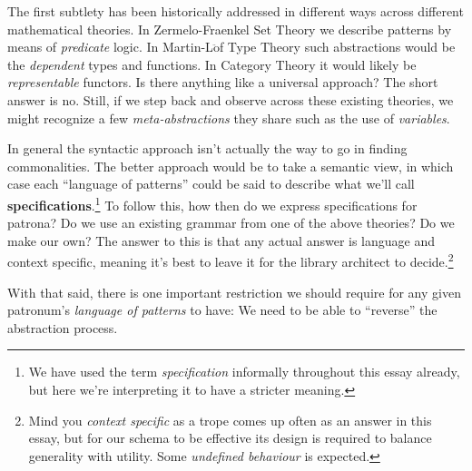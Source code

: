 \documentclass[twoside]{article}
\newcommand{\strong}[1]{{\bfseries #1}}
\newcommand{\mddot}[1]{\ensuremath{\ddot{\mbox{#1}}}}
\begin{document}
The first subtlety has been historically addressed in different ways across different mathematical theories. In Zermelo-Fraenkel
Set Theory we describe patterns by means of \emph{predicate} logic. In Martin-L\mddot{o}f Type Theory such abstractions would
be the \emph{dependent} types and functions. In Category Theory it would likely be \emph{representable} functors. Is there
anything like a universal approach? The short answer is no. Still, if we step back and observe across these existing theories,
we might recognize a few \emph{meta-abstractions} they share such as the use of \emph{variables}.

In general the syntactic approach isn't actually the way to go in finding commonalities. The better approach would
be to take a semantic view, in which case each ``language of patterns'' could be said to describe what we'll call
\strong{specifications}.\footnote{We have used the term \emph{specification} informally throughout this essay already,
but here we're interpreting it to have a stricter meaning.} To follow this, how then do we express specifications for patrona?
Do we use an existing grammar from one of the above theories? Do we make our own? The answer to this is that any actual answer
is language and context specific, meaning it's best to leave it for the library architect to decide.\footnote{Mind you
\emph{context specific} as a trope comes up often as an answer in this essay, but for our schema to be effective
its design is required to balance generality with utility. Some \emph{undefined behaviour} is expected.}

With that said, there is one important restriction we should require for any given patronum's \emph{language of patterns}
to have: We need to be able to ``reverse'' the abstraction process.
\end{document}
